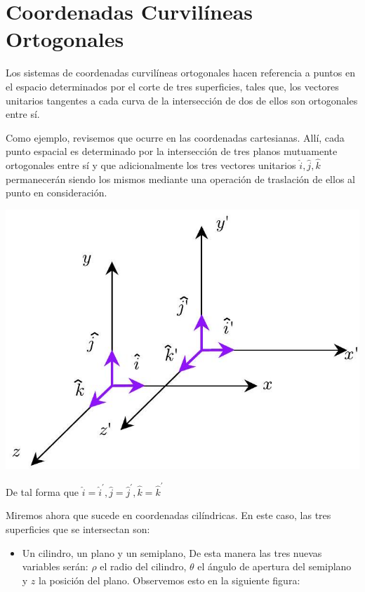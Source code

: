 \setchapterpreamble[u]{\margintoc}
\chapter{Coordenadas Curvilíneas Ortogonales}

Los sistemas de coordenadas curvilíneas ortogonales hacen referencia a puntos en el espacio determinados por el corte de tres superficies, tales que, los vectores unitarios tangentes a cada curva de la intersección de dos de ellos son ortogonales entre sí.

Como ejemplo, revisemos que ocurre en las coordenadas cartesianas. Allí, cada punto espacial es determinado por la intersección de tres planos mutuamente ortogonales entre sí y que adicionalmente los tres vectores unitarios $\hat{i}, \hat{j}, \hat{k}$ permanecerán siendo los mismos mediante una operación de traslación de ellos al punto en consideración.

\begin{center}
  \includegraphics[max width=\textwidth]{sistemas_coordenados.jpg}
\end{center}

De tal forma que $\hat{i}=\hat{i}^{\prime}, \hat{j}=\hat{j}^{\prime}, \hat{k}=\hat{k}^{\prime}$

Miremos ahora que sucede en coordenadas cilíndricas. En este caso, las tres superficies que se intersectan son:

\begin{itemize}
  \item Un cilindro, un plano y un semiplano, De esta manera las tres nuevas variables serán: $\rho$ el radio del cilindro, $\theta$ el ángulo de apertura del semiplano y $z$ la posición del plano. Observemos esto en la siguiente figura:
\end{itemize}

